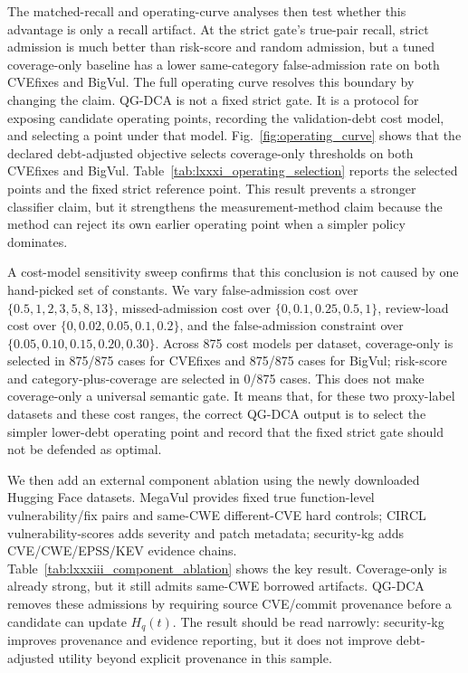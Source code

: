﻿\documentclass[lettersize,journal]{IEEEtran}
\begin{document}
The matched-recall and operating-curve analyses then test whether this advantage is only a recall artifact. At the strict gate's true-pair recall, strict admission is much better than risk-score and random admission, but a tuned coverage-only baseline has a lower same-category false-admission rate on both CVEfixes and BigVul. The full operating curve resolves this boundary by changing the claim. QG-DCA is not a fixed strict gate. It is a protocol for exposing candidate operating points, recording the validation-debt cost model, and selecting a point under that model. Fig.~\ref{fig:operating_curve} shows that the declared debt-adjusted objective selects coverage-only thresholds on both CVEfixes and BigVul. Table~\ref{tab:lxxxi_operating_selection} reports the selected points and the fixed strict reference point. This result prevents a stronger classifier claim, but it strengthens the measurement-method claim because the method can reject its own earlier operating point when a simpler policy dominates.

A cost-model sensitivity sweep confirms that this conclusion is not caused by one hand-picked set of constants. We vary false-admission cost over $\{0.5,1,2,3,5,8,13\}$, missed-admission cost over $\{0,0.1,0.25,0.5,1\}$, review-load cost over $\{0,0.02,0.05,0.1,0.2\}$, and the false-admission constraint over $\{0.05,0.10,0.15,0.20,0.30\}$. Across 875 cost models per dataset, coverage-only is selected in 875/875 cases for CVEfixes and 875/875 cases for BigVul; risk-score and category-plus-coverage are selected in 0/875 cases. This does not make coverage-only a universal semantic gate. It means that, for these two proxy-label datasets and these cost ranges, the correct QG-DCA output is to select the simpler lower-debt operating point and record that the fixed strict gate should not be defended as optimal.

We then add an external component ablation using the newly downloaded Hugging Face datasets. MegaVul provides fixed true function-level vulnerability/fix pairs and same-CWE different-CVE hard controls; CIRCL vulnerability-scores adds severity and patch metadata; security-kg adds CVE/CWE/EPSS/KEV evidence chains. Table~\ref{tab:lxxxiii_component_ablation} shows the key result. Coverage-only is already strong, but it still admits same-CWE borrowed artifacts. QG-DCA removes these admissions by requiring source CVE/commit provenance before a candidate can update $H_q(t)$. The result should be read narrowly: security-kg improves provenance and evidence reporting, but it does not improve debt-adjusted utility beyond explicit provenance in this sample.
\end{document}
